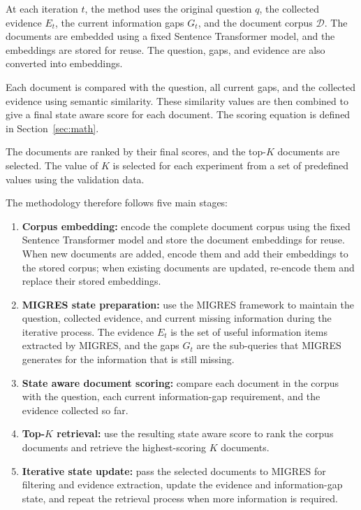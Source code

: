 \documentclass[12pt,a4paper]{report}
\begin{document}
At each iteration $t$, the method uses the original question $q$, the collected evidence $E_t$, the current information gaps $G_t$, and the document corpus $\mathcal{D}$. The documents are embedded using a fixed Sentence Transformer model, and the embeddings are stored for reuse. The question, gaps, and evidence are also converted into embeddings.

Each document is compared with the question, all current gaps, and the collected evidence using semantic similarity. These similarity values are then combined to give a final state aware score for each document. The scoring equation is defined in Section~\ref{sec:math}.

The documents are ranked by their final scores, and the top-$K$ documents are selected. The value of $K$ is selected for each experiment from a set of predefined values using the validation data.

The methodology therefore follows five main stages:

\begin{enumerate}[leftmargin=0.30in,itemsep=0.14in,parsep=0pt]
\item \textbf{Corpus embedding:} encode the complete document corpus using the fixed Sentence Transformer model and store the document embeddings for reuse. When new documents are added, encode them and add their embeddings to the stored corpus; when existing documents are updated, re-encode them and replace their stored embeddings.

\item \textbf{MIGRES state preparation:} use the MIGRES framework to maintain the question, collected evidence, and current missing information during the iterative process. The evidence $E_t$ is the set of useful information items extracted by MIGRES, and the gaps $G_t$ are the sub-queries that MIGRES generates for the information that is still missing.

\item \textbf{State aware document scoring:} compare each document in the corpus with the question, each current information-gap requirement, and the evidence collected so far.

\item \textbf{Top-$K$ retrieval:} use the resulting state aware score to rank the corpus documents and retrieve the highest-scoring $K$ documents.

\item \textbf{Iterative state update:} pass the selected documents to MIGRES for filtering and evidence extraction, update the evidence and information-gap state, and repeat the retrieval process when more information is required.
\end{enumerate}
\end{document}
